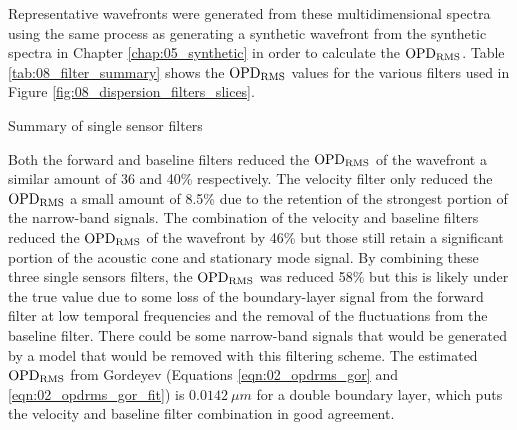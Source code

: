 Representative wavefronts were generated from these multidimensional spectra using the same process as generating a synthetic wavefront from the synthetic spectra in Chapter \ref{chap:05_synthetic} in order to calculate the $\operatorname{OPD_{RMS}}$.
Table \ref{tab:08_filter_summary} shows the $\operatorname{OPD_{RMS}}$ values for the various filters used in Figure \ref{fig:08_dispersion_filters_slices}.
\begin{table}
  \centering
  \caption{Summary of single sensor filters}
  
  \label{tab:08_filter_summary}
\end{table}
Both the forward and baseline filters reduced the $\operatorname{OPD_{RMS}}$ of the wavefront a similar amount of 36 and 40\% respectively.
The velocity filter only reduced the $\operatorname{OPD_{RMS}}$ a small amount of 8.5\% due to the retention of the strongest portion of the narrow-band signals.
The combination of the velocity and baseline filters reduced the $\operatorname{OPD_{RMS}}$ of the wavefront by 46\% but those still retain a significant portion of the acoustic cone and stationary mode signal.
By combining these three single sensors filters, the $\operatorname{OPD_{RMS}}$ was reduced 58\% but this is likely under the true value due to some loss of the boundary-layer signal from the forward filter at low temporal frequencies and the removal of the fluctuations from the baseline filter.
There could be some narrow-band signals that would be generated by a model that would be removed with this filtering scheme.
The estimated $\operatorname{OPD_{RMS}}$ from Gordeyev \cite{Gordeyev-2014-jcJndkHM} (Equations \ref{eqn:02_opdrms_gor} and \ref{eqn:02_opdrms_gor_fit}) is $0.0142\ \mu m$ for a double boundary layer, which puts the velocity and baseline filter combination in good agreement.


